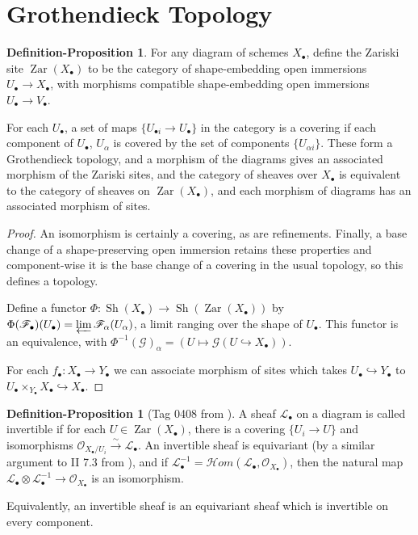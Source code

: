 \documentclass{report}
\theoremstyle{definition}
\newtheorem{defprop}[theorem]{Definition-Proposition}
\newcommand{\cHom}{\mathcal{H} \textit{om}}
\DeclareMathOperator{\Sh}{Sh}
\DeclareMathOperator{\Zar}{Zar}
\newcommand{\FF}{\mathscr{F}}
\newcommand{\GG}{\mathscr{G}}
\newcommand{\LL}{\mathcal{L}}
\newcommand{\OO}{\mathcal{O}}
\begin{document}
\section{Grothendieck Topology}
\begin{defprop}
	For any diagram of schemes $X_\bullet$, define the Zariski site $\Zar(X_\bullet)$ to be the category of shape-embedding open immersions $U_\bullet \rightarrow X_\bullet$, with morphisms compatible shape-embedding open immersions $U_\bullet \rightarrow V_\bullet$.
	
	For each $U_\bullet$, a set of maps $\{U_{\bullet i} \rightarrow U_\bullet\}$ in the category is a covering if each component of $U_\bullet$, $U_\alpha$ is covered by the set of components $\{U_{\alpha i}\}$.
	These form a Grothendieck topology, and a morphism of the diagrams gives an associated morphism of the Zariski sites, and the category of sheaves over $X_\bullet$ is equivalent to the category of sheaves on $\Zar(X_\bullet)$, and each morphism of diagrams has an associated morphism of sites.
\end{defprop}
\begin{proof}
	An isomorphism is certainly a covering, as are refinements.
	Finally, a base change of a shape-preserving open immersion retains these properties and component-wise it is the base change of a covering in the usual topology, so this defines a topology.
	
	Define a functor $\Phi : \Sh(X_\bullet) \rightarrow \Sh(\Zar(X_\bullet))$ by $\Phi(\FF_\bullet)(U_\bullet) = \varprojlim  \FF_{\alpha}(U_\alpha)$, a limit ranging over the shape of $U_\bullet$.
	This functor is an equivalence, with $\Phi^{-1}(\GG)_\alpha = (U \mapsto \GG(U \hookrightarrow X_\bullet))$.
	
	For each $f_\bullet : X_\bullet \rightarrow Y_\bullet$ we can associate morphism of sites which takes $U_\bullet \hookrightarrow Y_\bullet$ to $U_\bullet \times_{Y_\bullet} X_\bullet \hookrightarrow X_\bullet$.
\end{proof}

\begin{defprop}[Tag 0408 from \cite{stacks}]
	A sheaf $\LL_\bullet$ on a diagram is called invertible if for each $U \in \Zar(X_\bullet)$, there is a covering $\{U_i \rightarrow U\}$ and isomorphisms $\OO_{X_\bullet/U_i} \xrightarrow{\sim} \LL_\bullet$.
	An invertible sheaf is equivariant (by a similar argument to II 7.3 from \cite{Lipman2009}), and if $\LL_\bullet^{-1} = \cHom(\LL_\bullet, \OO_{X_\bullet})$, then the natural map $\LL_\bullet \otimes \LL_\bullet^{-1} \rightarrow \OO_{X_\bullet}$ is an isomorphism.
	
	Equivalently, an invertible sheaf is an equivariant sheaf which is invertible on every component.
\end{defprop}
\end{document}
